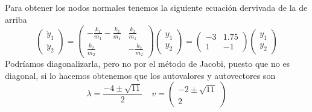 \documentclass{article}
\begin{document}
Para obtener los nodos normales tenemos la siguiente ecuación dervivada de la de arriba
\[\left(\begin{matrix}
	\ddot{y}_1 \\ \ddot{y}_2
\end{matrix}\right) = \left(\begin{matrix}
	-\frac{k_1}{m_1} -\frac{k_2}{m_1} & \frac{k_2}{m_1}\\
	\frac{k_2}{m_2} & -\frac{k_2}{m_2}
\end{matrix}\right) \left(\begin{matrix}
	y_1 \\ y_2
\end{matrix}\right) = \left(\begin{matrix}
	-3 & 1.75\\
	1 & -1
\end{matrix}\right) \left(\begin{matrix}
	y_1 \\ y_2
\end{matrix}\right) \]
Podríamos diagonalizarla, pero no por el método de Jacobi, puesto que no es diagonal, si lo hacemos obtenemos que los autovalores y autovectores son
\[\lambda = \frac{-4 \pm \sqrt{11}}{2} \ \ \ \ \ v = \left(\begin{matrix} -2 \pm \sqrt{11} \\ 2
\end{matrix}\right) \]
\end{document}
